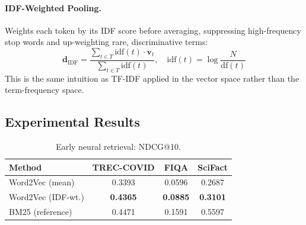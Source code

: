 \documentclass[12pt, a4paper]{article}
\makeatletter
\newcommand{\ndcg}{NDCG@10}
\newcommand{\tc}{TREC-COVID}
\newcommand{\fiqa}{FIQA}
\newcommand{\scifact}{SciFact}
\newcommand{\bvec}[1]{\mathbf{#1}}
\makeatother
\begin{document}
\paragraph{IDF-Weighted Pooling.}
Weights each token by its IDF score before averaging, suppressing
high-frequency stop words and up-weighting rare, discriminative terms:
\begin{equation}
  \bvec{d}_{\text{IDF}} =
    \frac{\displaystyle\sum_{t \in T} \text{idf}(t) \cdot \bvec{v}_t}
         {\displaystyle\sum_{t \in T} \text{idf}(t)},
  \quad \text{idf}(t) = \log\!\frac{N}{\text{df}(t)}
  \label{eq:idf_pool}
\end{equation}
This is the same intuition as TF-IDF applied in the vector space rather
than the term-frequency space.

\subsection{Experimental Results}

\begin{table}[h]
\centering
\caption{Early neural retrieval: \ndcg{}.}
\label{tab:w2v}
\begin{tabular}{lccc}
\toprule
\textbf{Method} & \textbf{\tc{}} & \textbf{\fiqa{}} & \textbf{\scifact{}} \\
\midrule
Word2Vec (mean)    & 0.3393 & 0.0596 & 0.2687 \\
Word2Vec (IDF-wt.) & \textbf{0.4365} & \textbf{0.0885} & \textbf{0.3101} \\
BM25 (reference)   & 0.4471 & 0.1591 & 0.5597 \\
\bottomrule
\end{tabular}
\end{table}
\end{document}
